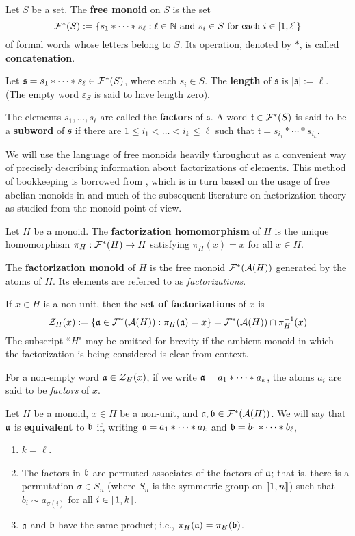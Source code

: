\begin{defn}
Let $S$ be a set.
The \textbf{free monoid} on $S$ is the set
\[\F^*(S) := \{s_1*\cdots*s_\ell: \ell\in \NN \textrm{ and } s_i\in S \textrm{ for each } i\in [1,\ell] \} \]
of formal words whose letters belong to $S$.
Its operation, denoted by $*$, is called \textbf{concatenation}.

Let $\mathfrak{s}= s_1 * \cdots * s_\ell  \in \F^*(S)$, where each $s_i\in S$.
The \textbf{length} of $\mathfrak{s}$ is $| \mathfrak{s} | := \ell$.
(The empty word $\varepsilon_S$ is said to have length zero).

The elements $s_1,\dots,s_\ell$ are called the \textbf{factors} of $\mathfrak{s}$. 
A word $\mathfrak{t}\in \F^*(S)$ is said to be a \textbf{subword} of $\mathfrak{s}$ if there are $1\le i_1 < \dots < i_k \le \ell$ such that $\mathfrak{t} = s_{i_1}*\cdots*s_{i_k}$.
\end{defn}


We will use the language of free monoids heavily throughout as a convenient way of precisely describing information about factorizations of elements.  
This method of bookkeeping is borrowed from \cite{fan-tringali18}, which is in turn based on the usage of free abelian monoids in \cite{geroldinger-hk06} and much of the subsequent literature on factorization theory as studied from the monoid point of view.


\begin{defn}
Let $H$ be a monoid.
The \textbf{factorization homomorphism} of $H$ is the unique homomorphism $\pi_H: \F^*(H) \to H$ satisfying $\pi_H(x) = x$ for all $x\in H$.

The \textbf{factorization monoid} of $H$ is the free monoid $\F^*(\A(H))$ generated by the atoms of $H$.
Its elements are referred to as \textit{factorizations}.

If $x\in H$ is a non-unit, then the \textbf{set of factorizations} of $x$ is
\[ \Z_H(x) := \{ \aa\in \F^*(\A(H)) : \pi_H(\aa) = x \} = \F^*(\A(H)) \cap \pi_H^{-1}(x) \]
The subscript ``$H$" may be omitted for brevity if the ambient monoid in which the factorization is being considered is clear from context.

For a non-empty word $\aa\in \Z_H(x)$, if we write $\aa = a_1*\cdots*a_k$, the atoms $a_i$ are said to be \textit{factors} of $x$.
\end{defn}

\begin{defn}
Let $H$ be a monoid, $x\in H$ be a non-unit, and $\aa,\bb \in \F^*(\A(H))$.
We will say that $\aa$ is \textbf{equivalent} to $\bb$ if, writing $\aa = a_1*\cdots * a_k$ and $\bb = b_1*\cdots * b_\ell$,
\begin{enumerate}
\item $k = \ell$.
\item The factors in $\bb$ are permuted associates of the factors of $\aa$; that is, there is a permutation $\sigma\in S_n$ (where $S_n$ is the symmetric group on $\llb 1,n \rrb$) such that $b_i \sim a_{\sigma(i)}$ for all $i\in \llb 1,k \rrb$.
\item $\aa$ and $\bb$ have the same product; i.e., $\pi_H(\aa) = \pi_H(\bb)$.
\end{enumerate}
\end{defn}

